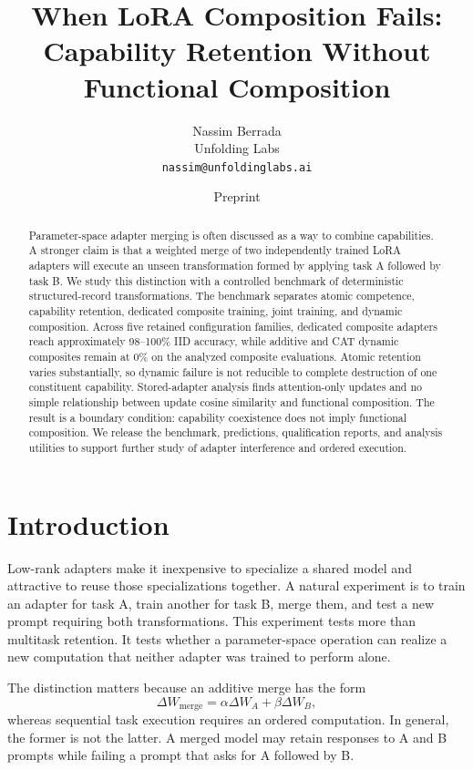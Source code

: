 \documentclass[10pt,twocolumn]{article}
\title{When LoRA Composition Fails: Capability Retention Without Functional Composition}
\author{Nassim Berrada\\Unfolding Labs\\\texttt{nassim@unfoldinglabs.ai}}
\date{Preprint}
\begin{document}
\maketitle

\begin{abstract}
Parameter-space adapter merging is often discussed as a way to combine capabilities. A stronger claim is that a weighted merge of two independently trained LoRA adapters will execute an unseen transformation formed by applying task A followed by task B. We study this distinction with a controlled benchmark of deterministic structured-record transformations. The benchmark separates atomic competence, capability retention, dedicated composite training, joint training, and dynamic composition. Across five retained configuration families, dedicated composite adapters reach approximately 98--100\% IID accuracy, while additive and CAT dynamic composites remain at 0\% on the analyzed composite evaluations. Atomic retention varies substantially, so dynamic failure is not reducible to complete destruction of one constituent capability. Stored-adapter analysis finds attention-only updates and no simple relationship between update cosine similarity and functional composition. The result is a boundary condition: capability coexistence does not imply functional composition. We release the benchmark, predictions, qualification reports, and analysis utilities to support further study of adapter interference and ordered execution.
\end{abstract}

\section{Introduction}

Low-rank adapters make it inexpensive to specialize a shared model and attractive to reuse those specializations together. A natural experiment is to train an adapter for task A, train another for task B, merge them, and test a new prompt requiring both transformations. This experiment tests more than multitask retention. It tests whether a parameter-space operation can realize a new computation that neither adapter was trained to perform alone.

The distinction matters because an additive merge has the form
\begin{equation}
    \Delta W_{\mathrm{merge}} = \alpha \Delta W_A + \beta \Delta W_B,
\end{equation}
whereas sequential task execution requires an ordered computation. In general, the former is not the latter. A merged model may retain responses to A and B prompts while failing a prompt that asks for A followed by B.
\end{document}
